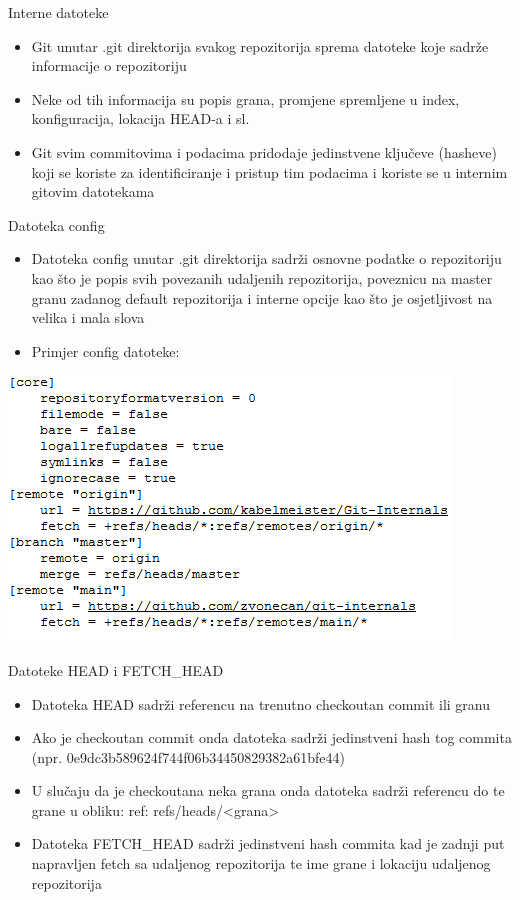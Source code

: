 \begin{frame}{Interne datoteke}
	\begin{itemize}
		\item{Git unutar .git direktorija svakog repozitorija sprema datoteke koje sadrže informacije o repozitoriju}
		\item{Neke od tih informacija su popis grana, promjene spremljene u index, konfiguracija, lokacija HEAD-a i sl.}
		\item{Git svim commitovima i podacima pridodaje jedinstvene ključeve (hasheve) koji se koriste za identificiranje i pristup tim podacima i koriste se u internim gitovim datotekama}
	\end{itemize}
\end{frame}
\begin{frame}{Datoteka config}
	\begin{itemize}
		\item{Datoteka config unutar .git direktorija sadrži osnovne podatke o repozitoriju kao što je popis svih povezanih udaljenih repozitorija, poveznicu na master granu zadanog default repozitorija i interne opcije kao što je osjetljivost na velika i mala slova}
		\item{Primjer config datoteke:}
	\end{itemize}
	\begin{center}
		\includegraphics[width=0.66\linewidth]{img/config.png}
	\end{center}
\end{frame}
\begin{frame}{Datoteke HEAD i FETCH\_HEAD}
	\begin{itemize}
		\item{Datoteka HEAD sadrži referencu na trenutno checkoutan commit ili granu}
		\item{Ako je checkoutan commit onda datoteka sadrži jedinstveni hash tog commita (npr. 0e9dc3b589624f744f06b34450829382a61bfe44)}
		\item{U slučaju da je checkoutana neka grana onda datoteka sadrži referencu do te grane u obliku: ref: refs/heads/<grana>}
		\item{Datoteka FETCH\_HEAD sadrži jedinstveni hash commita kad je zadnji put napravljen fetch sa udaljenog repozitorija te ime grane i lokaciju udaljenog repozitorija}
	\end{itemize}
\end{frame}